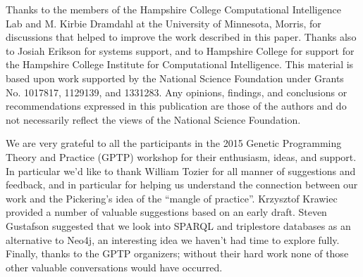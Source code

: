 \begin{acknowledgement}
	Thanks to the members of the Hampshire College Computational Intelligence Lab and M. Kirbie Dramdahl
	at the University of Minnesota, Morris, for discussions that 
	helped to improve the work described in this paper. Thanks also to Josiah Erikson for systems support, and to 
	Hampshire College for support for the Hampshire College Institute for Computational Intelligence. 
	This material is based upon work supported by the National Science Foundation under Grants No. 1017817, 
	1129139, and 1331283. Any opinions, findings, and conclusions or recommendations expressed in this 
	publication are those of the authors and do not necessarily reflect the views of the National 
	Science Foundation.	
	
	We are very grateful to all the participants in the 2015 Genetic Programming Theory and Practice (GPTP)
	workshop for their enthusiasm, ideas, and support. In particular we'd like to thank William Tozier 
	for all manner of suggestions and feedback, and in particular for helping us understand
	the connection between our work and the Pickering's idea of the ``mangle of practice''. Krzysztof Krawiec
	provided a number of valuable suggestions based on an early draft. Steven Gustafson suggested that we
	look into SPARQL and triplestore databases as an alternative to Neo4j, an interesting idea we haven't had time to
	explore fully. Finally, thanks to the GPTP organizers; without their hard work none of those other valuable
	conversations would have occurred.
\end{acknowledgement}



